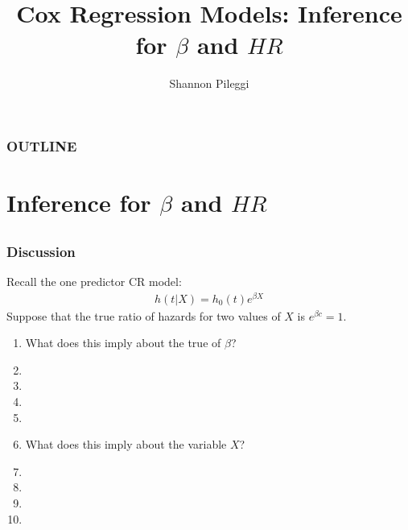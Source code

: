



\title[Set 9]{Cox Regression Models: Inference for $\beta$ and $HR$}
\author[Pileggi]{Shannon Pileggi}


\date{}




\begin{frame}
\titlepage
\end{frame}

\begin{frame}
\frametitle{OUTLINE\qquad\qquad\qquad} \tableofcontents[hideallsubsections]
\end{frame}


\section[Inference for $\beta$ and $HR$]{Inference for $\beta$ and $HR$}
\subsection{}

\begin{frame}
\frametitle{Discussion}
Recall the one predictor CR model:
\begin{eqnarray}
h(t|X) = h_0(t)e^{\beta X} \nonumber
\end{eqnarray}
Suppose that the true ratio of hazards for two values of $X$ is $e^{\beta c} = 1$.
\begin{enumerate}
\item  What does this imply about the true of $\beta$?
\item[]
\item[]
\item[]
\item[]
\item  What does this imply about the variable $X$?
\item[]
\item[]
\item[]
\item[]
\end{enumerate}
\end{frame}

